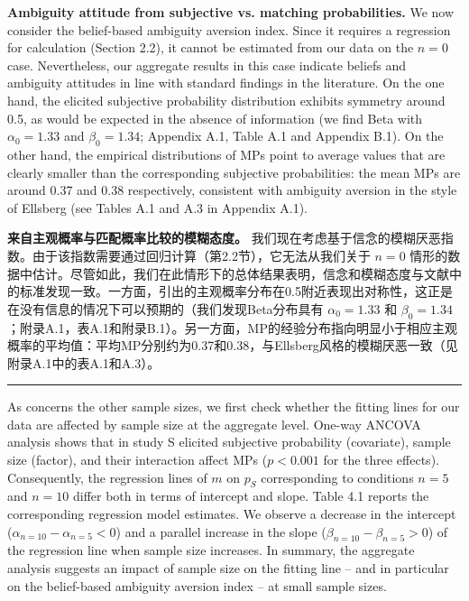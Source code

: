 \documentclass[12pt,a4paper]{article}
\newenvironment{original}
  {\par\vspace{0.5em}\noindent\color{black}\ignorespaces}
  {\par\vspace{0.3em}}
\newenvironment{translation}
  {\par\noindent\color{transblue}\ignorespaces}
  {\par\vspace{0.8em}\hrule\vspace{0.5em}}
\begin{document}
\begin{original}
\textbf{Ambiguity attitude from subjective vs. matching probabilities.} We now consider the belief-based ambiguity aversion index. Since it requires a regression for calculation (Section 2.2), it cannot be estimated from our data on the $n = 0$ case. Nevertheless, our aggregate results in this case indicate beliefs and ambiguity attitudes in line with standard findings in the literature. On the one hand, the elicited subjective probability distribution exhibits symmetry around 0.5, as would be expected in the absence of information (we find Beta with $\alpha_0 = 1.33$ and $\beta_0 = 1.34$; Appendix A.1, Table A.1 and Appendix B.1). On the other hand, the empirical distributions of MPs point to average values that are clearly smaller than the corresponding subjective probabilities: the mean MPs are around 0.37 and 0.38 respectively, consistent with ambiguity aversion in the style of Ellsberg (see Tables A.1 and A.3 in Appendix A.1).
\end{original}

\begin{translation}
\textbf{来自主观概率与匹配概率比较的模糊态度。} 我们现在考虑基于信念的模糊厌恶指数。由于该指数需要通过回归计算（第2.2节），它无法从我们关于 $n = 0$ 情形的数据中估计。尽管如此，我们在此情形下的总体结果表明，信念和模糊态度与文献中的标准发现一致。一方面，引出的主观概率分布在0.5附近表现出对称性，这正是在没有信息的情况下可以预期的（我们发现Beta分布具有 $\alpha_0 = 1.33$ 和 $\beta_0 = 1.34$；附录A.1，表A.1和附录B.1）。另一方面，MP的经验分布指向明显小于相应主观概率的平均值：平均MP分别约为0.37和0.38，与Ellsberg风格的模糊厌恶一致（见附录A.1中的表A.1和A.3）。
\end{translation}

\begin{original}
As concerns the other sample sizes, we first check whether the fitting lines for our data are affected by sample size at the aggregate level. One-way ANCOVA analysis shows that in study S elicited subjective probability (covariate), sample size (factor), and their interaction affect MPs ($p < 0.001$ for the three effects). Consequently, the regression lines of $m$ on $p_S$ corresponding to conditions $n = 5$ and $n = 10$ differ both in terms of intercept and slope. Table 4.1 reports the corresponding regression model estimates. We observe a decrease in the intercept ($\alpha_{n=10} - \alpha_{n=5} < 0$) and a parallel increase in the slope ($\beta_{n=10} - \beta_{n=5} > 0$) of the regression line when sample size increases. In summary, the aggregate analysis suggests an impact of sample size on the fitting line -- and in particular on the belief-based ambiguity aversion index -- at small sample sizes.
\end{original}
\end{document}
